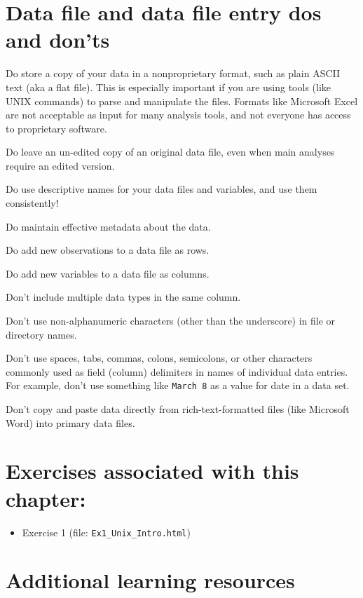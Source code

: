 \documentclass[]{book}
\providecommand{\tightlist}{%
  \setlength{\itemsep}{0pt}\setlength{\parskip}{0pt}}
\begin{document}
\hypertarget{data-file-and-data-file-entry-dos-and-donts}{%
\section{Data file and data file entry dos and don'ts}\label{data-file-and-data-file-entry-dos-and-donts}}

Do store a copy of your data in a nonproprietary format, such as plain ASCII text (aka a flat file). This is especially important if you are using tools (like UNIX commands) to parse and manipulate the files. Formats like Microsoft Excel are not acceptable as input for many analysis tools, and not everyone has access to proprietary software.

Do leave an un-edited copy of an original data file, even when main analyses require an edited version.

Do use descriptive names for your data files and variables, and use them consistently!

Do maintain effective metadata about the data.

Do add new observations to a data file as rows.

Do add new variables to a data file as columns.

Don't include multiple data types in the same column.

Don't use non-alphanumeric characters (other than the underscore) in file or directory names.

Don't use spaces, tabs, commas, colons, semicolons, or other characters commonly used as field (column) delimiters in names of individual data entries. For example, don't use something like \texttt{March\ 8} as a value for date in a data set.

Don't copy and paste data directly from rich-text-formatted files (like Microsoft Word) into primary data files.

\hypertarget{exercises-associated-with-this-chapter}{%
\section{Exercises associated with this chapter:}\label{exercises-associated-with-this-chapter}}

\begin{itemize}
\tightlist
\item
  Exercise 1 (file: \texttt{Ex1\_Unix\_Intro.html})
\end{itemize}

\hypertarget{additional-learning-resources}{%
\section{Additional learning resources}\label{additional-learning-resources}}
\end{document}
